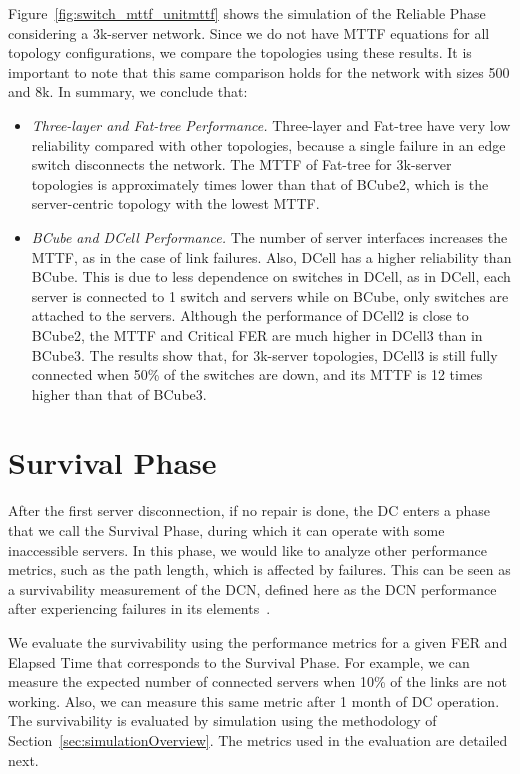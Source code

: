 Figure~\ref{fig:switch_mttf_unitmttf} shows the simulation of the Reliable Phase considering a 3k-server network. Since we do not have MTTF equations for all topology configurations, we compare the topologies using these results. It is important to note that this same comparison holds for the network with sizes 500 and 8k. In summary, we conclude that:
\begin{itemize}
\item \textit{Three-layer and Fat-tree Performance.} Three-layer and Fat-tree have very low reliability compared with other topologies, because a single failure in an edge switch disconnects the network. The MTTF of Fat-tree for 3k-server topologies is approximately  times lower than that of BCube2, which is the server-centric topology with the lowest MTTF.
\item \textit{BCube and DCell Performance.} The number of server interfaces increases the MTTF, as in the case of link failures. Also, DCell has a higher reliability than BCube. This is due to less dependence on switches in DCell, as in DCell, each server is connected to 1 switch and  servers while on BCube, only switches are attached to the servers. Although the performance of DCell2 is close to BCube2, the MTTF and Critical FER are much higher in DCell3 than in BCube3. The results show that, for 3k-server topologies, DCell3 is still fully connected when 50\% of the switches are down, and its MTTF is 12 times higher than that of BCube3.
\end{itemize}

\section{Survival Phase}
\label{sec:survival} 

After the first server disconnection, if no repair is done, the DC enters a phase that we call the Survival Phase, during which it can operate with some inaccessible servers. In this phase, we would like to analyze other performance metrics, such as the path length, which is affected by failures. This can be seen as a survivability measurement of the DCN, defined here as the DCN performance after experiencing failures in its elements~\cite{liew1994framework}.

We evaluate the survivability using the performance metrics for a given FER and Elapsed Time that corresponds to the Survival Phase. For example, we can measure the expected number of connected servers when 10\% of the links are not working. Also, we can measure this same metric after 1 month of DC operation. The survivability is evaluated by simulation using the methodology of Section~\ref{sec:simulationOverview}. The metrics used in the evaluation are detailed next.

